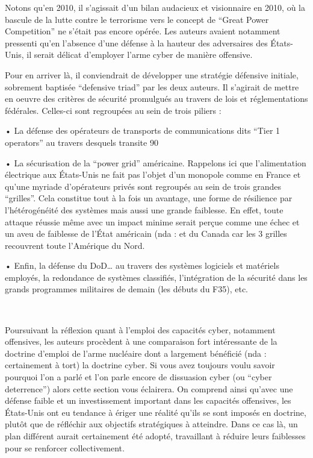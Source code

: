 Notons qu’en 2010, il s’agissait d’un bilan audacieux et visionnaire en 2010, où la bascule de la lutte contre le terrorisme vers le concept de “Great Power Competition” ne s’était pas encore opérée. Les auteurs avaient notamment pressenti qu’en l’absence d’une défense à la hauteur des adversaires des États-Unis, il serait délicat d’employer l’arme cyber de manière offensive. 

Pour en arriver là, il conviendrait de développer une stratégie défensive initiale, sobrement baptisée “defensive triad” par les deux auteurs. Il s’agirait de mettre en oeuvre des critères de sécurité promulgués au travers de lois et réglementations fédérales. Celles-ci sont regroupées au sein de trois piliers :

•               La défense des opérateurs de transports de communications dits “Tier 1 operators” au travers desquels transite 90 %

•               La sécurisation de la “power grid” américaine. Rappelons ici que l’alimentation électrique aux États-Unis ne fait pas l’objet d’un monopole comme en France et qu’une myriade d’opérateurs privés sont regroupés au sein de trois grandes “grilles”. Cela constitue tout à la fois un avantage, une forme de résilience par l’hétérogénéité des systèmes mais aussi une grande faiblesse. En effet, toute attaque réussie même avec un impact minime serait perçue comme une échec et un aveu de faiblesse de l’État américain (nda : et du Canada car les 3 grilles recouvrent toute l’Amérique du Nord.

•               Enfin, la défense du DoD… au travers des systèmes logiciels et matériels employés, la redondance de systèmes classifiés, l’intégration de la sécurité dans les grands programmes militaires de demain (les débuts du F35), etc.

 

Poursuivant la réflexion quant à l’emploi des capacités cyber, notamment offensives, les auteurs procèdent à une comparaison fort intéressante de la doctrine d’emploi de l’arme nucléaire dont a largement bénéficié (nda : certainement à tort) la doctrine cyber. Si vous avez toujours voulu savoir pourquoi l’on a parlé et l’on parle encore de dissuasion cyber (ou “cyber deterrence”) alors cette section vous éclairera. On comprend ainsi qu’avec une défense faible et un investissement important dans les capacités offensives, les États-Unis ont eu tendance à ériger une réalité qu’ils se sont imposés en doctrine, plutôt que de réfléchir aux objectifs stratégiques à atteindre. Dans ce cas là, un plan différent aurait certainement été adopté, travaillant à réduire leurs faiblesses pour se renforcer collectivement.

